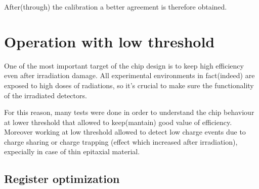 After(through) the calibration a better agreement is therefore obtained. 



\section{Operation with low threshold}


One of the most important target of the chip design is to keep high efficiency even after irradiation damage. All experimental environments in fact(indeed) are exposed to high doses of radiations, so it's crucial to make sure the functionality of the irradiated detectors.

For this reason, many tests were done in order to understand the chip behaviour at lower threshold that allowed to keep(mantain) good value of efficiency.
Moreover working at low threshold allowed to detect low charge events due to charge sharing or charge trapping (effect which increased after irradiation), expecially in case of thin epitaxial material. 






\begin{comment}
4. Explored also different registers settings to operate the chip with lower THResholds
 	- important after radiation damage to run at low THR to keep the hit efficiency high
5. Discovered & investigated an important issue with cross talk, due to digital signal from the redout, showing up when running the chip with THR below ~ 250 e- 
hot pixel studied to understand which digital signal was responsible & mitigate the effect with different settings/bias

Explain the function of the various registers used (see Eleonora thesis, and maybe can 		add also some scope picture). 
	Register optimization (conversion???)
	Comparison with simulation 
	Can add at the end some nice picture of the optimized thr and tuning 


boh:VOGLIAMO OPERARE A BASSE THRESHOLD PER RILEVARE EVENTI A BASSE CARICA A CAUSA DEL CHARGE TRAPPING AND CHARGE SHARING SOPRATTUTTO IN CASO DI THIN EPITAXIAL MATERIAL

\end{comment}



\subsection{Register optimization}


